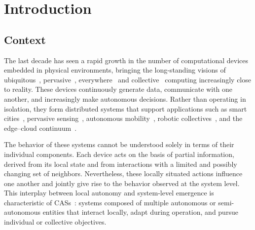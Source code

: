 
\chapter{Introduction}
\label{chap:introduction}
\minitoc

\section{Context}

The last decade has seen a rapid growth in the number
 of computational devices embedded in physical environments,
 bringing the long-standing visions of
 ubiquitous~\cite{DBLP:journals/sigmobile/Weiser03},
 pervasive~\cite{DBLP:journals/computer/SahaM03},
 everywhere~\cite{DBLP:journals/newriders/adam}
 and collective~\cite{DBLP:journals/computer/Abowd}
 computing increasingly close to reality.
%
These devices continuously generate data,
 communicate with one another, and increasingly make autonomous decisions.
%
Rather than operating in isolation,
 they form distributed systems that support applications such as
 smart cities~\cite{DBLP:journals/comsur/LeiTZLZS20}, 
 pervasive sensing~\cite{DBLP:journals/corr/abs-2606-18483}, 
 autonomous mobility~\cite{DBLP:journals/tits/ChuWCL20}, 
 robotic collectives~\cite{DBLP:journals/scp/AguzziV25},
 and the edge--cloud continuum~\cite{DBLP:journals/fgcs/FarabegoliDAV26}.

The behavior of these systems cannot be understood solely
 in terms of their individual components.
%
Each device acts on the basis of partial information,
 derived from its local state and from interactions with a limited
 and possibly changing set of neighbors.
%
Nevertheless,
 these locally situated actions influence one another
 and jointly give rise to the behavior observed at the system level.
%
This interplay between local autonomy
 and system-level emergence is characteristic of \glspl{CAS}~\cite{DBLP:conf/huc/Ferscha15}:
 systems composed of multiple autonomous or semi-autonomous entities that interact locally,
 adapt during operation, and pursue individual or collective objectives.

